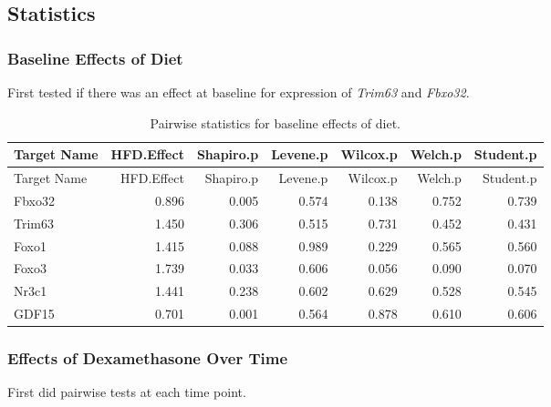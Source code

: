 \documentclass[]{article}
\begin{document}
\subsection{Statistics}\label{statistics}

\subsubsection{Baseline Effects of Diet}\label{baseline-effects-of-diet}

First tested if there was an effect at baseline for expression of
\emph{Trim63} and \emph{Fbxo32}.

\begin{longtable}[]{@{}lrrrrrr@{}}
\caption{Pairwise statistics for baseline effects of
diet.}\tabularnewline
\toprule
Target Name & HFD.Effect & Shapiro.p & Levene.p & Wilcox.p & Welch.p &
Student.p\tabularnewline
\midrule
\endfirsthead
\toprule
Target Name & HFD.Effect & Shapiro.p & Levene.p & Wilcox.p & Welch.p &
Student.p\tabularnewline
\midrule
\endhead
Fbxo32 & 0.896 & 0.005 & 0.574 & 0.138 & 0.752 & 0.739\tabularnewline
Trim63 & 1.450 & 0.306 & 0.515 & 0.731 & 0.452 & 0.431\tabularnewline
Foxo1 & 1.415 & 0.088 & 0.989 & 0.229 & 0.565 & 0.560\tabularnewline
Foxo3 & 1.739 & 0.033 & 0.606 & 0.056 & 0.090 & 0.070\tabularnewline
Nr3c1 & 1.441 & 0.238 & 0.602 & 0.629 & 0.528 & 0.545\tabularnewline
GDF15 & 0.701 & 0.001 & 0.564 & 0.878 & 0.610 & 0.606\tabularnewline
\bottomrule
\end{longtable}

\subsubsection{Effects of Dexamethasone Over
Time}\label{effects-of-dexamethasone-over-time}

First did pairwise tests at each time point.
\end{document}
